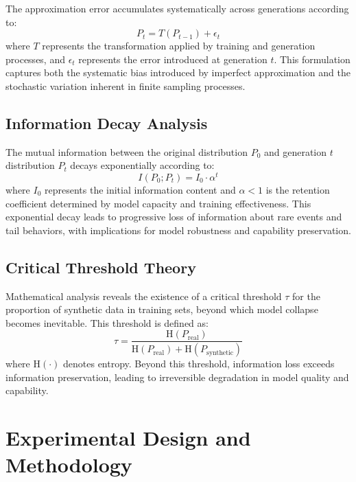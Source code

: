 \documentclass{article}
\begin{document}
The approximation error accumulates systematically across generations according to:
\begin{equation}
P_t = T(P_{t-1}) + \epsilon_t
\end{equation}
where $T$ represents the transformation applied by training and generation processes, and $\epsilon_t$ represents the error introduced at generation $t$. This formulation captures both the systematic bias introduced by imperfect approximation and the stochastic variation inherent in finite sampling processes.

\subsection{Information Decay Analysis}

The mutual information between the original distribution $P_0$ and generation $t$ distribution $P_t$ decays exponentially according to:
\begin{equation}
I(P_0; P_t) = I_0 \cdot \alpha^t
\end{equation}
where $I_0$ represents the initial information content and $\alpha < 1$ is the retention coefficient determined by model capacity and training effectiveness. This exponential decay leads to progressive loss of information about rare events and tail behaviors, with implications for model robustness and capability preservation.

\subsection{Critical Threshold Theory}

Mathematical analysis reveals the existence of a critical threshold $\tau$ for the proportion of synthetic data in training sets, beyond which model collapse becomes inevitable. This threshold is defined as:
\begin{equation}
\tau = \frac{\text{H}(P_{\text{real}})}{\text{H}(P_{\text{real}}) + \text{H}(P_{\text{synthetic}})}
\end{equation}
where $\text{H}(\cdot)$ denotes entropy. Beyond this threshold, information loss exceeds information preservation, leading to irreversible degradation in model quality and capability.

\section{Experimental Design and Methodology}
\end{document}
